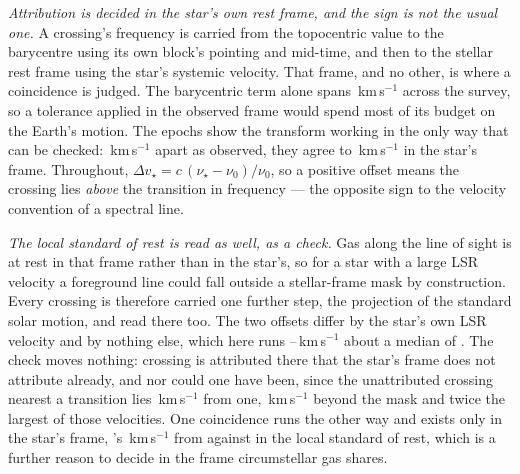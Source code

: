 \emph{Attribution is decided in the star's own rest frame, and the sign is
not the usual one.} A crossing's frequency is carried from the topocentric
value to the barycentre using its own block's pointing and mid-time, and then
to the stellar rest frame using the star's systemic velocity. That frame, and
no other, is where a coincidence is judged.
The barycentric term alone spans \FrBarySwing\,km\,s$^{-1}$ across the
survey, so a tolerance applied in the observed frame would spend most of its
budget on the Earth's motion. The \FrEpochNEpoch{} \FrEpochStar{} epochs show
the transform working in the only way that can be checked:
\FrEpochTopoKms\,km\,s$^{-1}$ apart as observed, they agree to
\FrEpochStelKms\,km\,s$^{-1}$ in the star's frame.
Throughout, $\Delta v_\star = c\,(\nu_\star-\nu_0)/\nu_0$, so a positive
offset means the crossing lies \emph{above} the transition in frequency ---
the opposite sign to the velocity convention of a spectral line.

\emph{The local standard of rest is read as well, as a check.} Gas along the
line of sight is at rest in that frame rather than in the star's, so for a
star with a large LSR velocity a foreground line could fall outside a
stellar-frame mask by construction. Every crossing is therefore carried one
further step, the projection of the standard solar motion, and read there
too. The two offsets differ by the star's own LSR velocity and by nothing
else, which here runs \LsVLsrLo--\LsVLsrHi\,km\,s$^{-1}$ about a median of
\LsVLsrMed. The check moves nothing: \LsNMoveWord{} crossing is attributed
there that the star's frame does not attribute already, and nor
could one have been, since the unattributed crossing nearest a transition lies
\LsNearestUnattr\,km\,s$^{-1}$ from one, \LsGapKms\,km\,s$^{-1}$ beyond the
mask and twice the largest of those velocities. One coincidence runs the
other way and exists only in the star's frame, \LsLeaveStar's
\LsLeaveDvStar\,km\,s$^{-1}$ from \LsLeaveLine{} against \LsLeaveDvLsr{} in
the local standard of rest, which is a further reason to decide in the frame
circumstellar gas shares.

